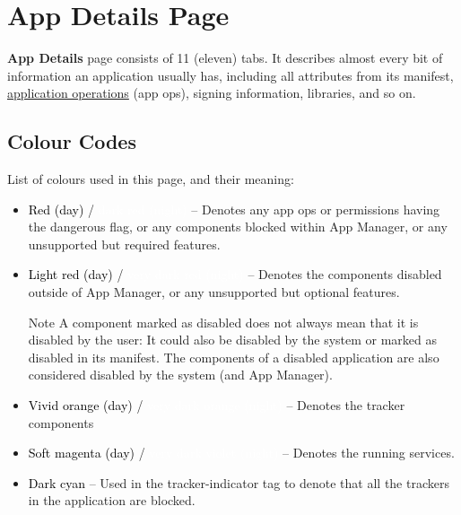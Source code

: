 \section{App Details Page}\label{sec:app-details-page} %
\textbf{App Details} page consists of 11 (eleven) tabs. It describes almost every bit of information
an application usually has, including all attributes from its manifest,
\hyperref[ch:app-ops]{application operations} (app ops), signing information, libraries, and so on.

\subsection{Colour Codes}\label{subsec:app-details-colour-codes} %
List of colours used in this page, and their meaning:
\begin{itemize}
    \item \colorbox{uninstalled-day}{\textcolor{black}{Red (day)}} / \colorbox{uninstalled-night}{\textcolor{white}{dark red (night)}}
    -- Denotes any app ops or permissions having the dangerous flag, or any components blocked
    within App Manager, or any unsupported but required features.

    \item \colorbox{disabled-day}{\textcolor{black}{Light red (day)}} / \colorbox{disabled-night}{\textcolor{white}{very
    dark red (night)}} -- Denotes the components disabled outside of App Manager, or any unsupported
    but optional features.

    \begin{tip}{Note}
        A component marked as disabled does not always mean that it is disabled by the user: It could also be disabled
        by the system or marked as disabled in its manifest. The components of a disabled application are also
        considered disabled by the system (and App Manager).
    \end{tip}

    \item \colorbox{tracker-day}{\textcolor{black}{Vivid orange (day)}} / \colorbox{tracker-night}{
        \textcolor{white}{very dark orange (night)}} -- Denotes the tracker components

    \item \colorbox{AMSoftMagenta}{\textcolor{black}{Soft magenta (day)}} / \colorbox{AMVeryDarkViolet}{
        \textcolor{white}{very dark violet (night)}} -- Denotes the running services.

    \item \colorbox{AMDarkCyan}{\textcolor{black}{Dark cyan}}  -- Used in the tracker-indicator tag
    to denote that all the trackers in the application are blocked.
\end{itemize}


